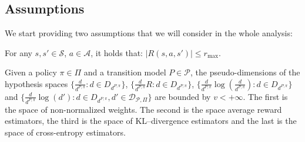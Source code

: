 \subsection{Assumptions}
We start providing two assumptions that we will consider in the whole analysis:
\begin{ass}
\label{ass:reward}
	For any $s,s' \in \mathcal{S}$, $a \in \mathcal{A}$, it holds that: $|R(s,a,s')| \leq r_{\max}$.
\end{ass}
\begin{ass}
\label{ass:dim}
	Given a policy $\pi \in \Pi$ and a transition model $P \in \mathcal{P}$, the pseudo-dimensions of the hypothesis spaces $\{ \frac{d}{d^{P,\pi}} : d \in D_{d^{P,\pi}}\}$, $\{ \frac{d}{d^{P,\pi}}R : d \in D_{d^{P,\pi}}\}$, $\{ \frac{d}{d^{P,\pi}} \log \left( \frac{d}{d^{P,\pi}} \right) : d \in D_{d^{P,\pi}}\}$ and $\{ \frac{d}{d^{P,\pi}} \log \left( d' \right) : d \in D_{d^{P,\pi}}, d' \in \mathcal{D}_{\mathcal{P}, \Pi} \}$ are bounded by $v < + \infty$. The first is the space of non-normalized weights. The second is the space average reward estimators, the third is the space of KL--divergence estimators and the last is the space of cross-entropy estimators.
	\end{ass}

